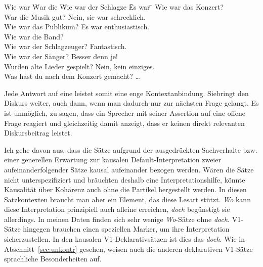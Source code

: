 \begin{exe}
        \ex \label{1035b}
        \begin{tabbing}
        Wie war \= War die \= Wie war der Schlagze \= Es war \= \kill
        Wie war das Konzert?\\
                \> War die Musik gut?                \>\> Nein, sie war schrecklich.\\
                \> Wie war das Publikum?        \>\> Es war enthusiastisch.\\       
                \> Wie war die Band?\\
                        \>\> Wie war der Schlagzeuger?        \>\> Fantastisch.\\
                        \>\> Wie war der Sänger?        \>\> Besser denn je!\\
                \> Wurden alte Lieder gespielt? \>\> Nein, kein einziges.\\
        Was hast du nach dem Konzert gemacht? \ldots
        \end{tabbing}
\end{exe}
Jede Antwort auf eine  leistet somit eine enge Kontextanbindung. Sie\linebreak bringt den Diskurs weiter, auch dann, wenn man dadurch nur zur nächsten Frage gelangt. Es ist unmöglich, zu sagen, dass ein Sprecher mit seiner Assertion auf eine offene Frage reagiert und gleichzeitig damit anzeigt, dass er keinen direkt relevanten Diskursbeitrag leistet.

Ich gehe davon aus, dass die Sätze aufgrund der ausgedrückten Sachverhalte bzw. einer generellen Erwartung zur kausalen Default-Interpretation zweier auf\-einanderfolgender Sätze kausal aufeinander bezogen werden. Wären die Sätze nicht unterspezifiziert und bräuchten deshalb eine Interpretationshilfe, könnte Kausa\-lität über Kohärenz auch ohne die Partikel hergestellt werden. In diesen Satzkontexten braucht man aber ein Element, das diese Lesart stützt. \textit{Wo} kann diese Interpretation prinzipiell auch alleine erreichen, \textit{doch} begünstigt sie allerdings. In meinen Daten finden sich sehr wenige \textit{Wo}-Sätze ohne \textit{doch}. V1-Sätze hingegen brauchen einen speziellen Marker, um ihre Interpretation sicherzustellen. In den kausalen V1-Deklarativsätzen ist dies das \textit{doch}. Wie in Abschnitt~\ref{sec:unkontr} gesehen, weisen auch die anderen deklarativen V1-Sätze sprachliche Besonderheiten auf. 

